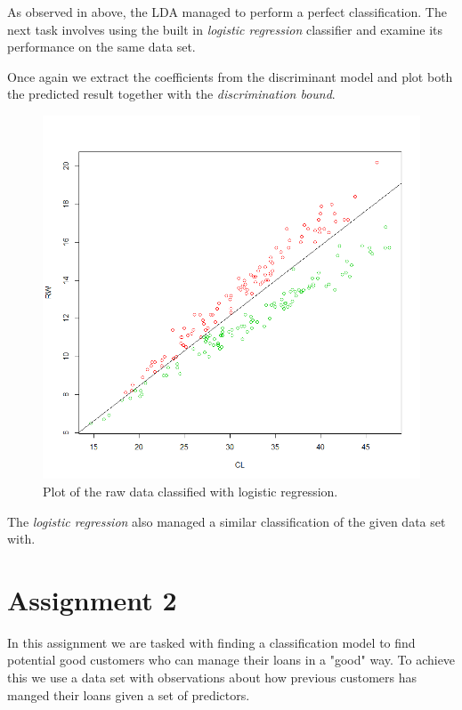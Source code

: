 \documentclass[a4paper,12pt]{article}
\begin{document}
As observed in above, the LDA managed to perform a perfect classification. The next task involves using the built in \textit{logistic regression} classifier and examine its performance on the same data set.

Once again we extract the coefficients from the discriminant model and plot both the predicted result together with the \textit{discrimination bound}.

\begin{figure}[H]
\centering
\begin{minipage}[]{0.5\textwidth}
  \includegraphics[width=\textwidth]{figures/logit_plot.png}  
  \caption{Plot of the raw data classified with logistic regression.\label{fig:logit_plot}}
 \end{minipage}
\end{figure}
The \textit{logistic regression} also managed a similar classification of the given data set with.

\section{Assignment 2}

In this assignment we are tasked with finding a classification model to find potential good customers who can manage their loans in a "good" way. To achieve this we use a data set with observations about how previous customers has manged their loans given a set of predictors. 
\end{document}
